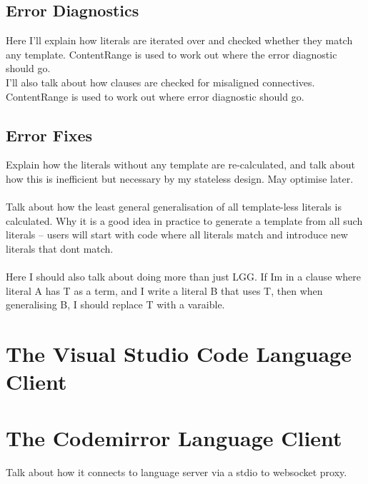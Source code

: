 \documentclass[../main.tex]{subfiles}
\begin{document}
\subsection{Error Diagnostics}
Here I'll explain how literals are iterated over and checked whether they match any template. ContentRange is used to work out where the error diagnostic should go.  \\ 
I'll also talk about how clauses are checked for misaligned connectives. ContentRange is used to work out where error diagnostic should go.

\subsection{Error Fixes}
Explain how the literals without any template are re-calculated, and talk about how this is inefficient but necessary by my stateless design. May optimise later. 
\\ 
\\ 
Talk about how the least general generalisation of all template-less literals is calculated. Why it is a good idea in practice to generate a template from all such literals -- users will start with code where all literals match and introduce new literals that dont match. 
\\ 
\\ 
Here I should also talk about doing more than just LGG. If Im in a clause where literal A has T as a term, and I write a literal B that uses T, then when generalising B, I should replace T with a varaible.


\section{The Visual Studio Code Language Client}

\section{The Codemirror Language Client}
Talk about how it connects to language server via a stdio to websocket proxy.
\end{document}
